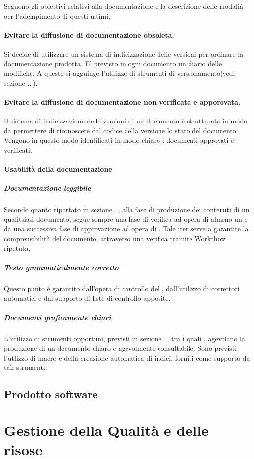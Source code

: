 \documentclass[12pt,a4paper]{article}
\begin{document}
Seguono gli obiettivi relativi alla documentazione e la descrizione  delle modalià oer l'adempimento di questi ultimi,

\paragraph {Evitare la diffusione di documentazione obsoleta.} 
Si decide di utilizzare un sistema di indicizzazione delle versioni  per ordinare la documentazione prodotta. E' previsto in ogni documento un diario delle modifiche.
A questo si agguinge l'utilizzo di strumenti di versionamento(vedi \NdP sezione ...).

\paragraph{Evitare la diffusione di documentazione non verificata e apporovata.}
Il sistema di indicizzazione delle versioni di un documento è strutturato in modo da permettere di riconoscere dal codice della versione lo stato del documento. Vengono in questo modo identificati in modo chiaro i documenti approvati e verificati.

\paragraph{Usabilità della documentazione}
\subparagraph{Documentazione leggibile}
Secondo quanto riportato in \NdP{} sezione..., alla fase di produzione dei contenuti di un qualitsiasi documento, segue sempre una fase di verifica ad opera di almeno un \VR{} e da una successiva fase di approvazione ad opera di \PM{}. Tale iter serve a garantire la comprensibilità del documento, attraverso una verifica tramite Workthow ripetuta,
\subparagraph{Testo grammaticalmente corretto} 
Questo punto è garantito dall'opera di controllo del \VR{}, dall'utilizzo di correttori automatici e dal supporto di liste di controllo apposite. 
\subparagraph{Documenti graficamente chiari}
L'utilizzo di strumenti opportuni, previsti in \NdP sezione..., tra i quali \latex, agevolano la produzione di un documento chiaro e agevolmente consultabile. Sono previsti l'utlizzo di macro e della creazione automatica di indici, forniti come supporto da tali strumenti.

\subsection{Prodotto software}

\section{Gestione della Qualità e delle risose}
\end{document}

